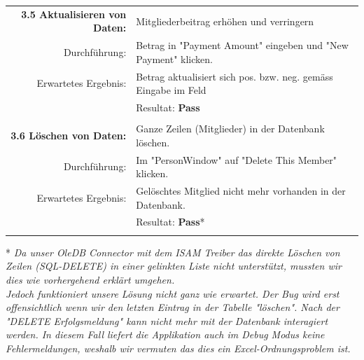 \documentclass{article}
\begin{document}
\begin{tabular}{r|p{12cm}}
	\textbf{3.5 Aktualisieren von Daten:} & Mitgliederbeitrag erhöhen und verringern\\
		Durchführung:			& Betrag in "Payment Amount" eingeben und "New Payment" klicken.\\
		Erwartetes Ergebnis: 	& Betrag aktualisiert sich pos. bzw. neg. gemäss Eingabe im Feld \\
								& Resultat:  \textbf{Pass}\hspace{7.7cm} \color{green} {\ding{51}} \\
								\\	
	\textbf{3.6 Löschen von Daten:} & Ganze Zeilen (Mitglieder) in der Datenbank löschen.\\
		Durchführung:			& Im "PersonWindow" auf "Delete This Member" klicken.\\
		Erwartetes Ergebnis: 	& Gelöschtes Mitglied nicht mehr vorhanden in der Datenbank. \\
								& Resultat:  \textbf{Pass}*\hspace{7.6cm} \color{carrotorange} {\ding{51}} \\
								\\								
	
\end{tabular}

* \textit{Da unser OleDB Connector mit dem ISAM Treiber das direkte Löschen von Zeilen (SQL-DELETE) in einer gelinkten Liste nicht unterstützt, mussten wir dies wie vorhergehend erklärt umgehen. 
\\
Jedoch funktioniert unsere Lösung nicht ganz wie erwartet. Der Bug wird erst offensichtlich wenn wir den letzten Eintrag in der Tabelle "löschen". Nach der "DELETE Erfolgsmeldung" kann nicht mehr mit der Datenbank interagiert werden. In diesem Fall liefert die Applikation auch im Debug Modus keine Fehlermeldungen, weshalb wir vermuten das dies ein Excel-Ordnungsproblem ist.} \\
\end{document}
